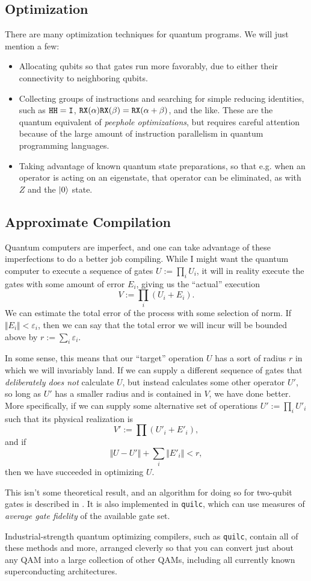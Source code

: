 \subsection{Optimization}
There are many optimization techniques for quantum programs. We will just mention a few:
\begin{itemize}
    \item Allocating qubits so that gates run more favorably, due to either their connectivity to neighboring qubits.
    \item Collecting groups of instructions and searching for simple reducing identities, such as $\mathtt{H} \mathtt{H}=\mathtt{I}$, $\mathtt{RX}(\alpha)\mathtt{RX}(\beta)=\mathtt{RX}(\alpha+\beta)$, and the like. These are the quantum equivalent of \emph{peephole optimizations}, but requires careful attention because of the large amount of instruction parallelism in quantum programming languages.
    \item Taking advantage of known quantum state preparations, so that e.g. when an operator is acting on an eigenstate, that operator can be eliminated, as with $Z$ and the $\ket{0}$ state.
\end{itemize}

\subsection{Approximate Compilation}
Quantum computers are imperfect, and one can take advantage of these imperfections to do a better job compiling. While I might want the quantum computer to execute a sequence of gates $U := \prod_i U_i$, it will in reality execute the gates with some amount of error $E_i$, giving us the ``actual'' execution \[V:=\prod_i (U_i + E_i).\] We can estimate the total error of the process with some selection of norm. If $\Vert E_i\Vert < \varepsilon_i$, then we can say that the total error we will incur will be bounded above by $r := \sum_i\varepsilon_i$.

In some sense, this means that our ``target'' operation $U$ has a sort of radius $r$ in which we will invariably land. If we can supply a different sequence of gates that \emph{deliberately does not} calculate $U$, but instead calculates some other operator $U'$, so long as $U'$ has a smaller radius and is contained in $V$, we have done better. More specifically, if we can supply some alternative set of operations $U' := \prod_i U'_i$ such that its physical realization is \[V' := \prod (U'_i + E'_i),\] and if \[\Vert U - U'\Vert + \sum_i \Vert E'_i\Vert < r,\] then we have succeeded in optimizing $U$.

This isn't some theoretical result, and an algorithm for doing so for two-qubit gates is described in \cite{noisycomp}. It is also implemented in \verb|quilc|, which can use measures of \emph{average gate fidelity} of the available gate set.

Industrial-strength quantum optimizing compilers, such as \verb|quilc|, contain all of these methods and more, arranged cleverly so that you can convert just about any QAM into a large collection of other QAMs, including all currently known superconducting architectures.
